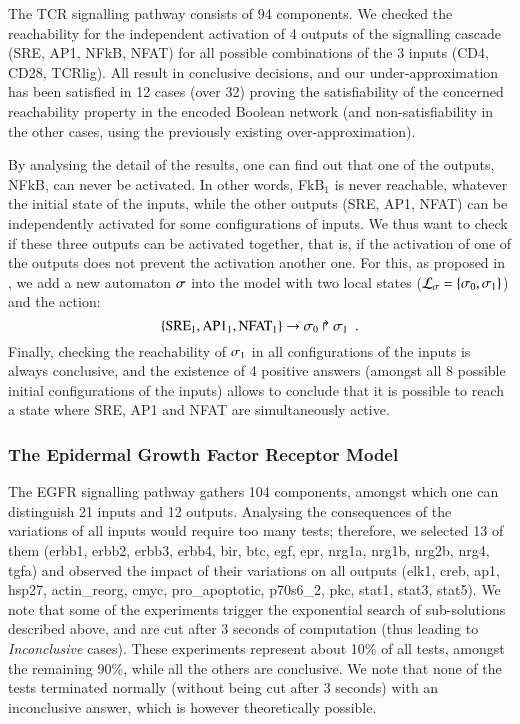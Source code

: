 The TCR signalling pathway consists of 94 components.
We checked the reachability for the independent activation of
4 outputs of the signalling cascade (SRE, AP1, NFkB, NFAT)
for all possible combinations of the 3 inputs (CD4, CD28, TCRlig).
All result in conclusive decisions,
and our under-approximation has been satisfied in 12 cases (over
32) proving the satisfiability of the concerned reachability property in the encoded Boolean network
(and non-satisfiability in the other cases, using the previously existing over-approximation).

By analysing the detail of the results, one can find out that one of the outputs, NFkB, can never be activated.
In other words, FkB$_1$ is never reachable, whatever the initial state of the inputs,
while the other outputs (SRE, AP1, NFAT) can be independently activated
for some configurations of inputs.
We thus want to check if these three outputs can be activated together,
that is, if the activation of one of the outputs does not prevent the activation another one.
For this, as proposed in ,
we add a new automaton $\sigma$ into the model
with two local states ($\mathcal{L}_\sigma = \{ \sigma_0, \sigma_1 \}$)
and the action:
\[ \{\text{SRE}_1, \text{AP1}_1, \text{NFAT}_1\}\rightarrow\sigma_0\Rsh\sigma_1 \enspace. \]
Finally, checking the reachability of $\sigma_1$ in all configurations of the inputs
is always conclusive,
and the existence of 4 positive answers
(amongst all 8 possible initial configurations of the inputs) allows to conclude that
it is possible to reach a state where SRE, AP1 and NFAT are simultaneously active.

\subsubsection*{The Epidermal Growth Factor Receptor Model}

The EGFR signalling pathway gathers 104 components, amongst which one can distinguish
21 inputs and 12 outputs.
Analysing the consequences of the variations of all inputs
would require too many tests;
therefore, we selected 13 of them
(erbb1, erbb2, erbb3, erbb4, bir, btc, egf, epr, nrg1a, nrg1b, nrg2b, nrg4, tgfa)
and observed the impact of their variations on all outputs
(elk1, creb, ap1, hsp27, actin\_reorg, cmyc, pro\_apoptotic, p70s6\_2, pkc, stat1, stat3, stat5).
We note that some of the experiments trigger the exponential search
of sub-solutions described above, and are cut after 3 seconds of computation
(thus leading to \emph{Inconclusive} cases).
These experiments represent about 10\% of all tests,
amongst the remaining 90\%, while all the others are conclusive.
We note that none of the tests terminated normally (without being cut after 3 seconds)
with an inconclusive answer, which is however theoretically possible.

